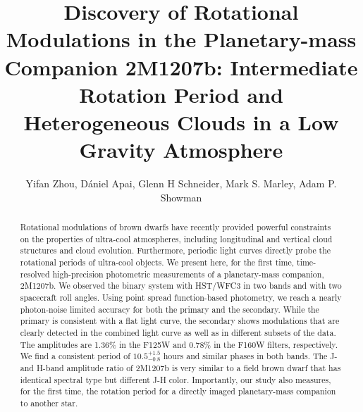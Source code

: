 \documentclass[apj]{emulateapj}
\newcommand{\period}{$10.5^{+1.5}_{-0.8}$}
\begin{document}
\title{Discovery of Rotational Modulations in the Planetary-mass
  Companion 2M1207\lowercase{b}: Intermediate Rotation Period and Heterogeneous Clouds in a Low
  Gravity Atmosphere}
\author{Yifan Zhou, D\'aniel Apai,
  Glenn H Schneider,  Mark S. Marley,
  Adam P. Showman}


\begin{abstract}
  Rotational modulations of brown dwarfs have recently provided
  powerful constraints on the properties of ultra-cool atmospheres,
  including longitudinal and vertical cloud structures and cloud
  evolution. Furthermore, periodic light curves directly probe the
  rotational periods of ultra-cool objects.  We present here, for the
  first time, time-resolved high-precision photometric measurements of
  a planetary-mass companion, 2M1207b.  We observed the binary
  system with HST/WFC3 in two bands and with two spacecraft roll
  angles. Using point spread function-based photometry, we reach a
  nearly photon-noise limited accuracy for both the primary and the
  secondary. While the primary is consistent with a flat light curve,
  the secondary shows modulations that are clearly detected in the
  combined light curve as well as in different subsets of the data.
  The amplitudes are 1.36\% in the F125W and 0.78\% in the F160W
  filters, respectively. We find a consistent period of
\period{} hours and
  similar phases in both bands. The J- and H-band amplitude ratio of
  2M1207b is very similar to a field brown dwarf that has identical
  spectral type but different J-H color.  Importantly, our study also
  measures, for the first time, the rotation period for a directly 
  imaged planetary-mass companion to another star.
\end{abstract}

\maketitle
%
\end{document}
